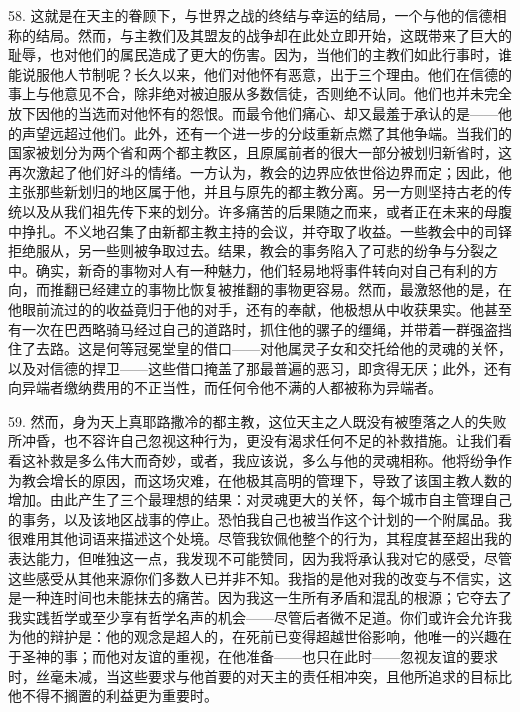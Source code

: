 58. 这就是在天主的眷顾下，与世界之战的终结与幸运的结局，一个与他的信德相称的结局。然而，与主教们及其盟友的战争却在此处立即开始，这既带来了巨大的耻辱，也对他们的属民造成了更大的伤害。因为，当他们的主教们如此行事时，谁能说服他人节制呢？长久以来，他们对他怀有恶意，出于三个理由。他们在信德的事上与他意见不合，除非绝对被迫服从多数信徒，否则绝不认同。他们也并未完全放下因他的当选而对他怀有的怨恨。而最令他们痛心、却又最羞于承认的是——他的声望远超过他们。此外，还有一个进一步的分歧重新点燃了其他争端。当我们的国家被划分为两个省和两个都主教区，且原属前者的很大一部分被划归新省时，这再次激起了他们好斗的情绪。一方认为，教会的边界应依世俗边界而定；因此，他主张那些新划归的地区属于他，并且与原先的都主教分离。另一方则坚持古老的传统以及从我们祖先传下来的划分。许多痛苦的后果随之而来，或者正在未来的母腹中挣扎。不义地召集了由新都主教主持的会议，并夺取了收益。一些教会中的司铎拒绝服从，另一些则被争取过去。结果，教会的事务陷入了可悲的纷争与分裂之中。确实，新奇的事物对人有一种魅力，他们轻易地将事件转向对自己有利的方向，而推翻已经建立的事物比恢复被推翻的事物更容易。然而，最激怒他的是，在他眼前流过的的收益竟归于他的对手，还有的奉献，他极想从中收获果实。他甚至有一次在巴西略骑马经过自己的道路时，抓住他的骡子的缰绳，并带着一群强盗挡住了去路。这是何等冠冕堂皇的借口——对他属灵子女和交托给他的灵魂的关怀，以及对信德的捍卫——这些借口掩盖了那最普遍的恶习，即贪得无厌；此外，还有向异端者缴纳费用的不正当性，而任何令他不满的人都被称为异端者。\par

59. 然而，身为天上真耶路撒冷的都主教，这位天主之人既没有被堕落之人的失败所冲昏，也不容许自己忽视这种行为，更没有渴求任何不足的补救措施。让我们看看这补救是多么伟大而奇妙，或者，我应该说，多么与他的灵魂相称。他将纷争作为教会增长的原因，而这场灾难，在他极其高明的管理下，导致了该国主教人数的增加。由此产生了三个最理想的结果：对灵魂更大的关怀，每个城市自主管理自己的事务，以及该地区战事的停止。恐怕我自己也被当作这个计划的一个附属品。我很难用其他词语来描述这个处境。尽管我钦佩他整个的行为，其程度甚至超出我的表达能力，但唯独这一点，我发现不可能赞同，因为我将承认我对它的感受，尽管这些感受从其他来源你们多数人已并非不知。我指的是他对我的改变与不信实，这是一种连时间也未能抹去的痛苦。因为我这一生所有矛盾和混乱的根源；它夺去了我实践哲学或至少享有哲学名声的机会——尽管后者微不足道。你们或许会允许我为他的辩护是：他的观念是超人的，在死前已变得超越世俗影响，他唯一的兴趣在于圣神的事；而他对友谊的重视，在他准备——也只在此时——忽视友谊的要求时，丝毫未减，当这些要求与他首要的对天主的责任相冲突，且他所追求的目标比他不得不搁置的利益更为重要时。\par

